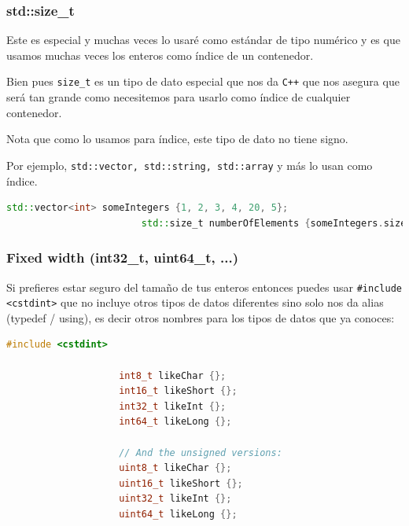 \documentclass[12pt, fleqn]{report}                             %
\theoremstyle{break}                                            %
\newcommand{\textCode}[1]  { \texttt{#1} }                      %
\newcommand \Cpp  {\textCode{C++} }                               %
\begin{document}
                \subsubsection{std::size\_t}

                    Este es especial y muchas veces lo usaré como estándar de tipo numérico
                    y es que usamos muchas veces los enteros como índice de un contenedor.

                    Bien pues \textCode{size\_t} es un tipo de dato especial que nos da \Cpp
                    que nos asegura que será tan grande como necesitemos para usarlo como índice
                    de cualquier contenedor.

                    Nota que como lo usamos para índice, este tipo de dato no tiene signo.

                    Por ejemplo, \textCode{std::vector, std::string, std::array} y más lo usan
                    como índice.

                    \begin{lstlisting}[language=C++, gobble=24]
                        std::vector<int> someIntegers {1, 2, 3, 4, 20, 5};
                        std::size_t numberOfElements {someIntegers.size()}; 
                    \end{lstlisting}


                \subsubsection{Fixed width (int32\_t, uint64\_t, ...)}

                Si prefieres estar seguro del tamaño de tus enteros entonces puedes usar 
                \textCode{\#include <cstdint>} que no incluye otros tipos de datos diferentes sino solo
                nos da alias (typedef / using), es decir otros nombres para los tipos de datos que ya conoces:
                \begin{lstlisting}[language=C++, gobble=20]
                    #include <cstdint>
                    
                    int8_t likeChar {};
                    int16_t likeShort {};
                    int32_t likeInt {};
                    int64_t likeLong {};

                    // And the unsigned versions:
                    uint8_t likeChar {};
                    uint16_t likeShort {};
                    uint32_t likeInt {};
                    uint64_t likeLong {};
                \end{lstlisting}
                    
\end{document}
